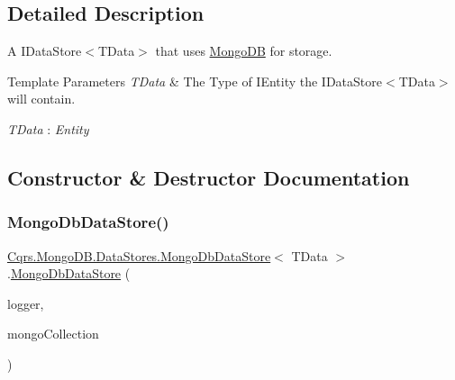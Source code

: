 \subsection{Detailed Description}
A I\+Data\+Store$<$\+T\+Data$>$ that uses \hyperlink{namespaceCqrs_1_1MongoDB}{Mongo\+DB} for storage. 


\begin{DoxyTemplParams}{Template Parameters}
{\em T\+Data} & The Type of I\+Entity the I\+Data\+Store$<$\+T\+Data$>$ will contain.\\
\hline
\end{DoxyTemplParams}
\begin{Desc}
\item[Type Constraints]\begin{description}
\item[{\em T\+Data} : {\em Entity}]\end{description}
\end{Desc}


\subsection{Constructor \& Destructor Documentation}
\mbox{\label{classCqrs_1_1MongoDB_1_1DataStores_1_1MongoDbDataStore_a039b75f6f011fa89b5dd724bee6b64cb_a039b75f6f011fa89b5dd724bee6b64cb}} 
\subsubsection{\texorpdfstring{Mongo\+Db\+Data\+Store()}{MongoDbDataStore()}}
{\footnotesize\ttfamily \hyperlink{classCqrs_1_1MongoDB_1_1DataStores_1_1MongoDbDataStore}{Cqrs.\+Mongo\+D\+B.\+Data\+Stores.\+Mongo\+Db\+Data\+Store}$<$ T\+Data $>$.\hyperlink{classCqrs_1_1MongoDB_1_1DataStores_1_1MongoDbDataStore}{Mongo\+Db\+Data\+Store} (\begin{DoxyParamCaption}\item[{I\+Logger}]{logger,  }\item[{I\+Mongo\+Collection$<$ T\+Data $>$}]{mongo\+Collection }\end{DoxyParamCaption})}



